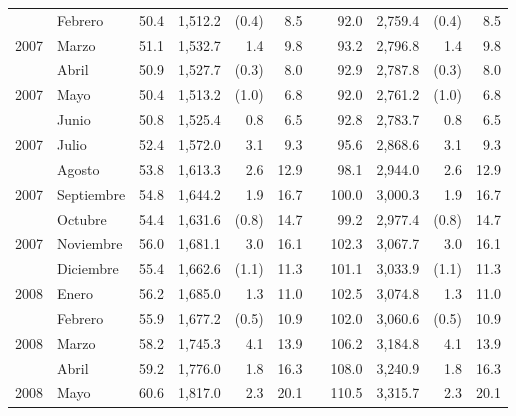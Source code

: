 \begin{center}
\begin{longtable}{llrrrrrrrrr}
		\rowcolor{color1!5!white}\multicolumn{1}{l}{	2007	}&	Febrero	&	 50.4 	&	 1,512.2 	&	 (0.4)	&	 8.5 	&  &	 92.0 	&	 2,759.4 	&	 (0.4)	&	 8.5 	\\
		\multicolumn{1}{l}{	2007	}&	Marzo	&	 51.1 	&	 1,532.7 	&	 1.4 	&	 9.8 	&  &	 93.2 	&	 2,796.8 	&	 1.4 	&	 9.8 	\\
		\rowcolor{color1!5!white}\multicolumn{1}{l}{	2007	}&	Abril	&	 50.9 	&	 1,527.7 	&	 (0.3)	&	 8.0 	&  &	 92.9 	&	 2,787.8 	&	 (0.3)	&	 8.0 	\\
		\multicolumn{1}{l}{	2007	}&	Mayo	&	 50.4 	&	 1,513.2 	&	 (1.0)	&	 6.8 	&  &	 92.0 	&	 2,761.2 	&	 (1.0)	&	 6.8 	\\
		\rowcolor{color1!5!white}\multicolumn{1}{l}{	2007	}&	Junio	&	 50.8 	&	 1,525.4 	&	 0.8 	&	 6.5 	&  &	 92.8 	&	 2,783.7 	&	 0.8 	&	 6.5 	\\
		\multicolumn{1}{l}{	2007	}&	Julio	&	 52.4 	&	 1,572.0 	&	 3.1 	&	 9.3 	&  &	 95.6 	&	 2,868.6 	&	 3.1 	&	 9.3 	\\
		\rowcolor{color1!5!white}\multicolumn{1}{l}{	2007	}&	Agosto	&	 53.8 	&	 1,613.3 	&	 2.6 	&	 12.9 	&  &	 98.1 	&	 2,944.0 	&	 2.6 	&	 12.9 	\\
		\multicolumn{1}{l}{	2007	}&	Septiembre	&	 54.8 	&	 1,644.2 	&	 1.9 	&	 16.7 	&  &	 100.0 	&	 3,000.3 	&	 1.9 	&	 16.7 	\\
		\rowcolor{color1!5!white}\multicolumn{1}{l}{	2007	}&	Octubre	&	 54.4 	&	 1,631.6 	&	 (0.8)	&	 14.7 	&  &	 99.2 	&	 2,977.4 	&	 (0.8)	&	 14.7 	\\
		\multicolumn{1}{l}{	2007	}&	Noviembre	&	 56.0 	&	 1,681.1 	&	 3.0 	&	 16.1 	&  &	 102.3 	&	 3,067.7 	&	 3.0 	&	 16.1 	\\
		\rowcolor{color1!5!white}\multicolumn{1}{l}{	2007	}&	Diciembre	&	 55.4 	&	 1,662.6 	&	 (1.1)	&	 11.3 	&  &	 101.1 	&	 3,033.9 	&	 (1.1)	&	 11.3 	\\
		\multicolumn{1}{l}{	2008	}&	Enero	&	 56.2 	&	 1,685.0 	&	 1.3 	&	 11.0 	&  &	 102.5 	&	 3,074.8 	&	 1.3 	&	 11.0 	\\
		\rowcolor{color1!5!white}\multicolumn{1}{l}{	2008	}&	Febrero	&	 55.9 	&	 1,677.2 	&	 (0.5)	&	 10.9 	&  &	 102.0 	&	 3,060.6 	&	 (0.5)	&	 10.9 	\\
		\multicolumn{1}{l}{	2008	}&	Marzo	&	 58.2 	&	 1,745.3 	&	 4.1 	&	 13.9 	&  &	 106.2 	&	 3,184.8 	&	 4.1 	&	 13.9 	\\
		\rowcolor{color1!5!white}\multicolumn{1}{l}{	2008	}&	Abril	&	 59.2 	&	 1,776.0 	&	 1.8 	&	 16.3 	&  &	 108.0 	&	 3,240.9 	&	 1.8 	&	 16.3 	\\
		\multicolumn{1}{l}{	2008	}&	Mayo	&	 60.6 	&	 1,817.0 	&	 2.3 	&	 20.1 	&  &	 110.5 	&	 3,315.7 	&	 2.3 	&	 20.1 	\\

\end{longtable}
\end{center}
